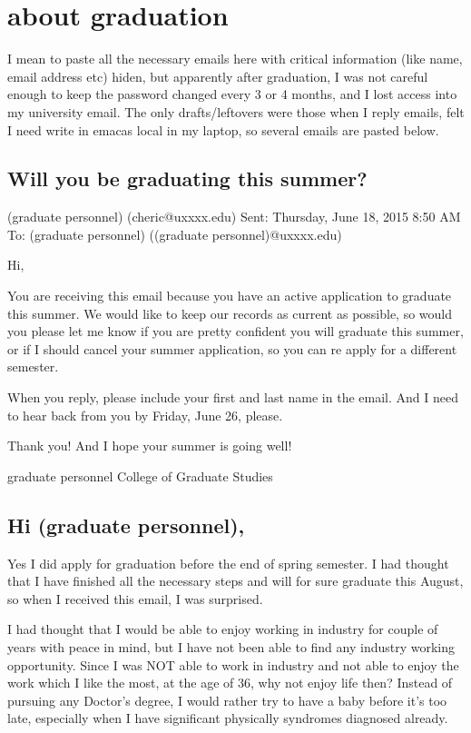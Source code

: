 \documentclass[9pt,b5paper]{article}
\begin{document}
\section{about graduation}
\label{sec-6}
I mean to paste all the necessary emails here with critical information (like name, email address etc) hiden, but apparently after graduation, I was not careful enough to keep the password changed every 3 or 4 months, and I lost access into my university email. The only drafts/leftovers were those when I reply emails, felt I need write in emacas local in my laptop, so several emails are pasted below. 
\subsection{Will you be graduating this summer?}
\label{sec-6-1}
(graduate personnel) (cheric@uxxxx.edu)
Sent:        Thursday, June 18, 2015 8:50 AM
To:        (graduate personnel) ((graduate personnel)@uxxxx.edu)

Hi,

You are receiving this email because you have an active application to graduate this summer. We would like to keep our records as current as possible, so  would you please let me know if you are pretty confident you will graduate this summer, or if I should cancel your summer application, so you can re apply for a different semester.

When you reply, please include your first and last name in the email. And I need to hear back from you by Friday, June 26, please.

Thank you! And I hope your summer is going well!

graduate personnel
College of Graduate Studies

\subsection{Hi (graduate personnel),}
\label{sec-6-2}

Yes I did apply for graduation before the end of spring semester. I had thought that I have finished all the necessary steps and will for sure graduate this August, so when I received this email, I was surprised. 

I had thought that I would be able to enjoy working in industry for couple of years with peace in mind, but I have not been able to find any industry working opportunity. Since I was NOT able to work in industry and not able to enjoy the work which I like the most, at the age of 36, why not enjoy life then? Instead of pursuing any Doctor's degree, I would rather try to have a baby before it's too late, especially when I have significant physically syndromes diagnosed already.  
\end{document}
